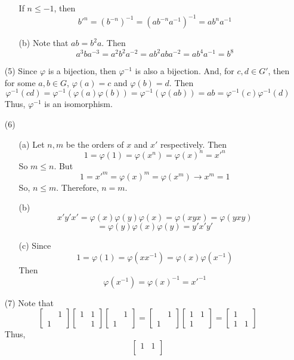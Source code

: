 \begin{itemize}
\begin{itemize}
If $n \leq -1$, then
$$b'^n = (b^{-n})^{-1} = (ab^{-n}a^{-1})^{-1} = ab^{n}a^{-1}$$
\item[(b)]
Note that $ab = b^2a$. Then
$$a^3ba^{-3} = a^2b^2a^{-2} = ab^2aba^{-2} = ab^4a^{-1} = b^8$$
\end{itemize}
\item[(5)]
Since $\varphi$ is a bijection, then $\varphi^{-1}$ is also a bijection. And, for $c, d \in G'$, then for some $a, b \in G$, $\varphi(a) = c$ and $\varphi(b) = d$. Then 
$$\varphi^{-1}(cd) = \varphi^{-1}(\varphi(a)\varphi(b)) = \varphi^{-1}(\varphi(ab)) = ab = \varphi^{-1}(c)\varphi^{-1}(d)$$
Thus, $\varphi^{-1}$ is an isomorphism.
\item[(6)]
\begin{itemize}
\item[(a)]
Let $n, m$ be the orders of $x$ and $x'$ respectively. Then
$$1 = \varphi(1) = \varphi(x^n) = \varphi(x)^n = x'^n$$
So $m \leq n$. But
$$1 = x'^m = \varphi(x)^m = \varphi(x^m) \rightarrow x^m = 1$$
So, $n \leq m$. Therefore, $n = m$.
\item[(b)]
$$x'y'x' = \varphi(x)\varphi(y)\varphi(x) = \varphi(xyx) = \varphi(yxy)$$
$$= \varphi(y)\varphi(x)\varphi(y) = y'x'y'$$
\item[(c)]
Since
$$1 = \varphi(1) = \varphi(xx^{-1}) = \varphi(x)\varphi(x^{-1})$$
Then
$$\varphi(x^{-1}) = \varphi(x)^{-1} = x'^{-1}$$
\end{itemize}
\item[(7)]
Note that
$$\begin{bmatrix}
& 1 \\
1 &
\end{bmatrix}\begin{bmatrix}
1 & 1 \\
& 1
\end{bmatrix}\begin{bmatrix}
& 1 \\
1 &
\end{bmatrix} = \begin{bmatrix}
& 1 \\
1
\end{bmatrix}\begin{bmatrix}
1 & 1 \\
1
\end{bmatrix} = \begin{bmatrix}
1 \\
1 & 1
\end{bmatrix}$$
Thus,
$$\begin{bmatrix}
1 & 1 \\

\end{bmatrix}$$
\end{itemize}
